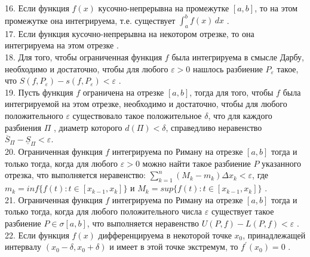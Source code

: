 \documentclass[12pt]{article}
\begin{document}
16. Если функция ${\displaystyle f(x)}$ кусочно-непрерывна на промежутке ${\displaystyle [a,b]}$, то на этом промежутке она интегрируема, т.е. существует ${\displaystyle \int _{a}^{b} f(x) \, dx}$ .\\

17. Если функция кусочно-непрерывна на некотором отрезке, то она интегрируема на этом отрезке .\\

18. Для того, чтобы ограниченная функция ${\displaystyle f}$ была интегрируема в смысле Дарбу, необходимо и достаточно, чтобы для любого ${\displaystyle \varepsilon>0}$ нашлось разбиение ${\displaystyle P_{\varepsilon}}$ такое, что ${\displaystyle S(f, P_{\varepsilon})-s(f, P_{\varepsilon})<\varepsilon}$ .\\

19. Пусть функция ${\displaystyle f}$ ограничена на отрезке ${\displaystyle \left[ {a,b} \right]}$, тогда для того, чтобы ${\displaystyle f}$ была интегрируемой на этом отрезке, необходимо и достаточно, чтобы  для любого положительного ${\displaystyle \varepsilon}$ существовало такое положительное ${\displaystyle \delta}$, что для каждого разбиения ${\displaystyle \Pi}$ , диаметр которого ${\displaystyle d\left( \Pi \right) < \delta}$, справедливо неравенство ${\displaystyle {\overline S_{\Pi} } - {\underline S_{\Pi}} < \varepsilon}$.\\

20. Ограниченная функция ${\displaystyle f}$ интегрируема по Риману на отрезке ${\displaystyle [a,b]}$ тогда и только тогда, когда для любого ${\displaystyle \varepsilon>0}$ можно найти такое разбиение ${\displaystyle P}$ указанного отрезка, что выполняется неравенство: ${\displaystyle \sum \limits _{k=1}^{n} (M_k-m_k)\Delta x_k<\varepsilon}$, где ${\displaystyle m_k=inf \{f(t):t\in[x_{k-1},x_k]\}}$ и ${\displaystyle M_k=sup \{f(t):t\in[x_{k-1},x_k]\}}$ .\\

21. Ограниченная функция ${\displaystyle f}$  интегрируема по Риману на отрезке ${\displaystyle [a,b]}$ тогда и только тогда, когда для любого положительного числа ${\displaystyle \varepsilon}$ существует такое разбиение ${\displaystyle P\in \sigma[a,b]}$, что выполняется неравенство ${\displaystyle U(P,f) - L(P,f) < \varepsilon}$ .\\

22. Если функция ${\displaystyle f(x)}$ дифференцируема в некоторой точке  ${\displaystyle x_0}$, принадлежащей интервалу ${\displaystyle (x_0-\delta,x_0+\delta)}$ и имеет в этой точке экстремум, то ${\displaystyle f^{\prime}(x_0)=0}$ .\\
\end{document}
